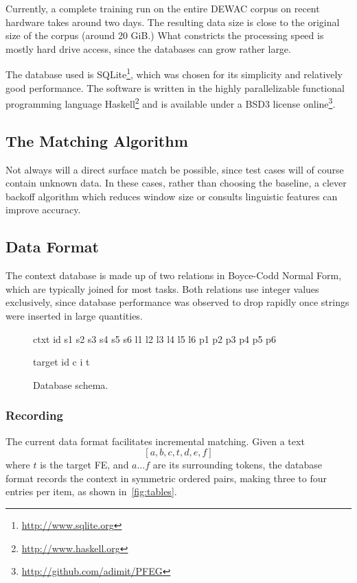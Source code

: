 \documentclass[draft,12pt]{article}
\begin{document}
Currently, a complete training run on the entire DEWAC corpus on recent hardware
takes around two days.  The resulting data size is close to the original size of
the corpus (around 20 GiB.) What constricts the processing speed is mostly hard
drive access, since the databases can grow rather large.

The database used is SQLite\footnote{\url{http://www.sqlite.org}}, which was chosen for its
simplicity and relatively good performance. The software is written
in the highly parallelizable functional programming language
Haskell\footnote{\url{http://www.haskell.org}} and is available under a BSD3
license online\footnote{\url{http://github.com/adimit/PFEG}}.

\subsection{The Matching Algorithm}

Not always will a direct surface match be possible, since test cases will of
course contain unknown data. In these cases, rather than choosing the baseline,
a clever backoff algorithm which reduces window size or consults linguistic
features can improve accuracy.

\subsection{Data Format}

The context database is made up of two relations in Boyce-Codd Normal Form,
which are typically joined for most tasks. Both relations use integer values
exclusively, since database performance was observed to drop rapidly once
strings were inserted in large quantities.

\begin{figure}
ctxt id s1 s2 s3 s4 s5 s6 l1 l2 l3 l4 l5 l6 p1 p2 p3 p4 p5 p6

target id c i t
\caption{Database schema.}
\end{figure}

\subsubsection{Recording}

   The current data format facilitates incremental matching.
   Given a text \[[a,b,c,t,d,e,f]\] where $t$ is the target FE, and $a\ldots{}f$ are its
   surrounding tokens, the database format records the context in symmetric
   ordered pairs, making three to four entries per item, as shown
   in~\ref{fig:tables}.
\end{document}
